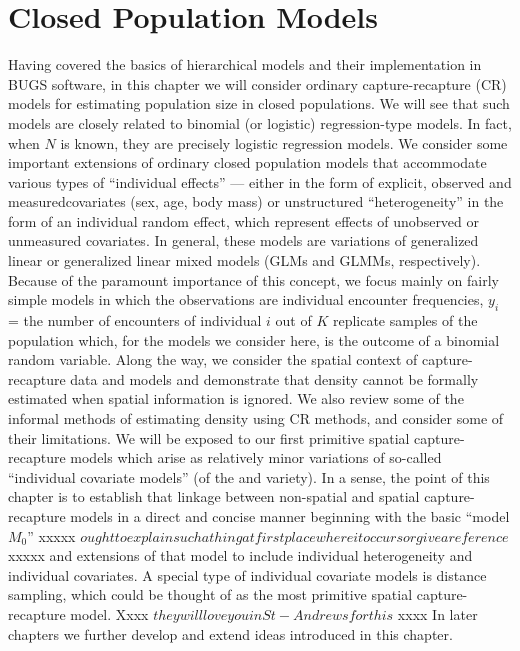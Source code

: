 \chapter{
 Closed Population Models
}
\label{chapt.closed}

\vspace{.3in}

Having covered the basics of hierarchical models and their implementation in BUGS software, 
in this chapter we will consider ordinary capture-recapture (CR)
models for estimating population size in closed populations. We will
see that such models are closely related to binomial (or logistic)
regression-type models. In fact, when $N$ is known, they are precisely
logistic regression models.  We consider some important extensions of ordinary closed
population models that accommodate various types of ``individual
effects'' --- either in the form of explicit, observed and measuredcovariates (sex, age,
body mass) or unstructured ``heterogeneity'' in the form of an
individual random effect, which represent effects of unobserved or unmeasured covariates. In general, these models are variations of
generalized linear or generalized linear mixed models (GLMs and GLMMs, respectively).
Because of the paramount importance of this concept, we focus mainly
on fairly simple models in which the observations are individual
encounter frequencies, $y_{i}$ = the number of encounters of
individual $i$ out of $K$ replicate samples of the population which,
for the models we consider here, is the outcome of a binomial random
variable.  Along the way, we consider the spatial context of
capture-recapture data and models and demonstrate that density cannot
be formally estimated when spatial information is ignored. We also
review some of the informal methods of estimating density using CR
methods, and consider some of their limitations.  We will be exposed
to our first primitive spatial capture-recapture models which arise as
relatively minor variations of so-called ``individual covariate
models'' (of the \citet{huggins:1989} and \citet{alho:1990}
variety). In a sense, the point of this chapter is to establish that
linkage  between non-spatial and spatial capture-recapture models 
 in a direct and concise manner beginning with the basic
``model $M_0$'' xxxxx $ought to explain such a thing at first place where it occurs or give a reference$ xxxxx and extensions of that model to include individual
heterogeneity and individual covariates. A special type of
individual covariate models is distance sampling, which could be
thought of as the most primitive spatial capture-recapture model. Xxxx $they will love you in St-Andrews for this$ xxxx In
later chapters we further develop and extend ideas introduced in this
chapter.

